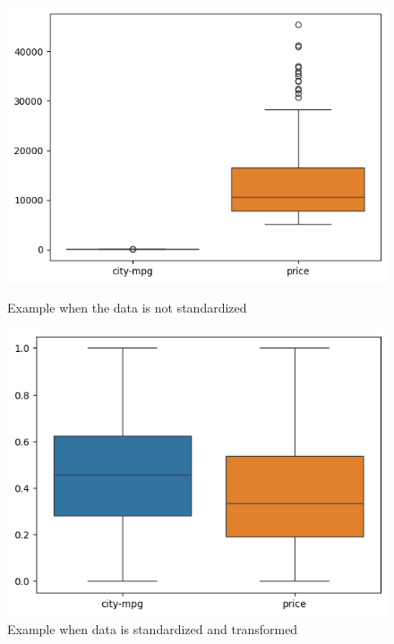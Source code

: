 \documentclass{article}
\begin{document}
\begin{figure}[H]
  \centering
  \begin{minipage}[b]{0.5\textwidth}
      \centering
      \includegraphics[width=\textwidth]{box.png}
      \caption*{Example when the data is not standardized}
      \label{fig:box}
  \end{minipage}
  \begin{minipage}[b]{0.5\textwidth}
      \centering
      \includegraphics[width=\textwidth]{box2.png}
      \caption*{Example when data is standardized and transformed}
      \label{fig:box2}
  \end{minipage}
\end{figure}
\end{document}
